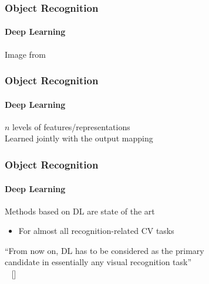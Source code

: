 \documentclass[xetex,professionalfont]{beamer}
\begin{document}
\begin{frame}
\frametitle{Object Recognition}
\framesubtitle{Deep Learning}

\begin{center}
	{\centering Image from \cite{bengio2014}}
\end{center}

\end{frame}


\begin{frame}
\frametitle{Object Recognition}
\framesubtitle{Deep Learning}

$n$ levels of features/representations\\\medskip
Learned jointly with the output mapping

\bigskip
\begin{center}
\end{center}

\end{frame}


\begin{frame}
\frametitle{Object Recognition}
\framesubtitle{Deep Learning}

Methods based on DL are state of the art
\begin{itemize}
	\item For almost all recognition-related CV tasks
\end{itemize}

\bigskip
\begin{center}
	\enquote{From now on, DL has to be considered as the primary\\ candidate in essentially any visual recognition task}\\
	~ [\cite{razavian14}] %
\end{center}

\end{frame}
\end{document}
